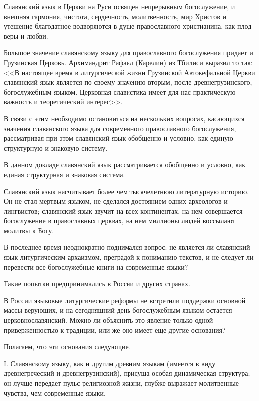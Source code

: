 \documentclass[11pt,a4paper,oneside]{memoir}
\begin{document}
    Славянский язык в Церкви на Руси освящен непрерывным богослужение, и внешняя гармония, чистота, сердечность, молитвенность, мир Христов и утешение благодатное водворяются в душе православного христианина, как плод веры и любви.
    
    Большое значение славянскому языку для православного богослужения придает и Грузинская Церковь. Архимандрит Рафаил (Карелин) из Тбилиси выразил то так: <<В настоящее время в литургической жизни Грузинской Автокефальной Церкви славянский язык является по своему значению вторым, после древнегрузинского, богослужебным языком. Церковная славистика имеет для нас практическую важность и теоретический интерес>>.
    
    В связи с этим необходимо остановиться на нескольких вопросах, касающихся значения славянского языка для современного православного богослужения, рассматривая при этом славянский язык обобщенно и условно, как единую структурную и знаковую систему.
    
    В данном докладе славянский язык рассматривается обобщенно и условно, как единая структурная и знаковая система.
    
    Славянский язык насчитывает более чем тысячелетнюю литературную историю. Он не стал мертвым языком, не сделался достоянием одних археологов и лингвистов; славянский язык звучит на всех континентах, на нем совершается богослужение в православных церквах, на нем миллионы людей воссылают молитвы к Богу.
    
    В последнее время неоднократно поднимался вопрос: не является ли славянский язык литургическим архаизмом, преградой к пониманию текстов, и не следует ли перевести все богослужебные книги на современные языки?
    
    Такие попытки предпринимались в России и других странах.
    
    В России языковые литургические реформы не встретили поддержки основной массы верующих, и на сегодняшний день богослужебным языком остается церковнославянский. Можно ли объяснить это явление только одной приверженностью к традиции, или же оно имеет еще другие основания?
    
    Полагаем, что эти основания следующие.
    
    I. Славянскому языку, как и другим древним языкам (имеется в виду древнегреческий и древнегрузинский), присуща особая динамическая структура; он лучше передает пульс религиозной жизни, глубже выражает молитвенные чувства, чем современные языки.
    
\end{document}

